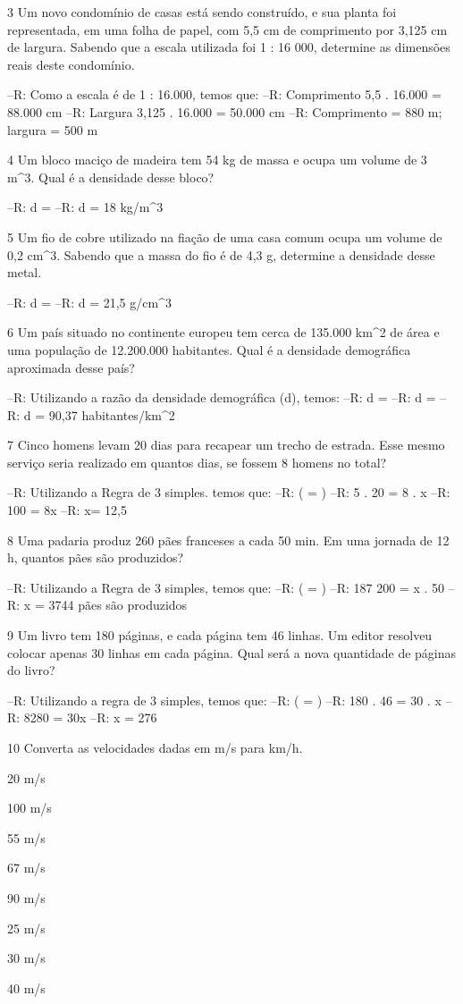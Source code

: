 {\num{3} Um novo condomínio de casas está sendo construído, e sua planta foi
representada, em uma folha de papel, com 5,5 cm de comprimento por 3,125
cm de largura. Sabendo que a escala utilizada foi 1 : 16 000, determine
as dimensões reais deste condomínio.

--R: Como a escala é de 1 : 16.000, temos que:
--R: Comprimento 5,5 . 16.000 = 88.000 cm
--R: Largura 3,125 . 16.000 = 50.000 cm
--R: Comprimento = 880 m; largura = 500 m

\num{4} Um bloco maciço de madeira tem 54 kg de massa e ocupa um volume de 3
m^3. Qual é a densidade desse bloco?

--R: d = 
--R: d = 18 kg/m^3

\num{5} Um fio de cobre utilizado na fiação de uma casa comum ocupa um volume
de 0,2 cm^3. Sabendo que a massa do fio é de 4,3 g, determine a densidade
desse metal.

--R: d = 
--R: d = 21,5 g/cm^3

\num{6} Um país situado no continente europeu tem cerca de 135.000 km^2 de
área e uma população de 12.200.000 habitantes. Qual é a densidade
demográfica aproximada desse país?

--R: Utilizando a razão da densidade demográfica (d), temos:
--R: d = 
--R: d = 
--R: d = 90,37 habitantes/km^2

\num{7} Cinco homens levam 20 dias para recapear um trecho de estrada. Esse
mesmo serviço seria realizado em quantos dias, se fossem 8 homens no
total?

--R: Utilizando a Regra de 3 simples. temos que:
--R: ( = )
--R: 5 . 20 = 8 . x
--R: 100 = 8x
--R: x= 12,5

\num{8} Uma padaria produz 260 pães franceses a cada 50 min. Em uma jornada
de 12 h, quantos pães são produzidos?

--R: Utilizando a Regra de 3 simples, temos que:
--R: ( = )
--R: 187 200 = x . 50
--R: x = 3744 pães são produzidos

\num{9} Um livro tem 180 páginas, e cada página tem 46 linhas. Um editor
resolveu colocar apenas 30 linhas em cada página. Qual será a nova
quantidade de páginas do livro?

--R: Utilizando a regra de 3 simples, temos que:
--R: ( = )
--R: 180 . 46 = 30 . x
--R: 8280 = 30x
--R: x = 276

\num{10} Converta as velocidades dadas em m/s para km/h.
\item 20 m/s
\item 100 m/s
\item 55 m/s
\item 67 m/s
\item 90 m/s
\item 25 m/s
\item 30 m/s
\item 40 m/s

}
